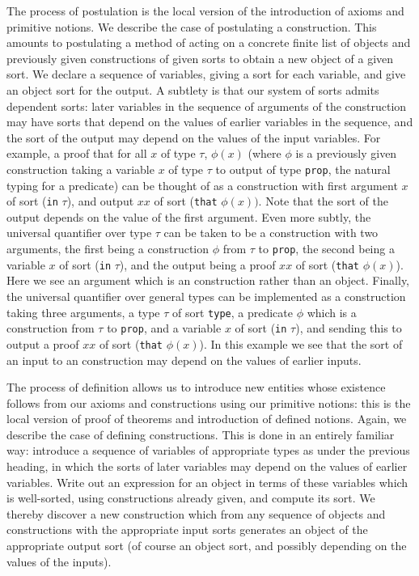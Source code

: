 \documentclass[12pt]{article}
\begin{document}
The process of postulation is the local version of the introduction of axioms and primitive notions.  We describe the case of postulating a construction.  This amounts to postulating a method of acting on a concrete finite list of objects and previously given constructions of given
sorts to obtain a new object of a given sort.  We declare a sequence of variables, giving a sort for each variable, and give an object sort for the output.  A subtlety is that our system of sorts admits dependent sorts:  later variables in the sequence of arguments of the construction may have sorts that depend on the values of  earlier variables in the sequence,  and the sort of the output may depend on the values of the input variables.  For example,
a proof that for all $x$ of type $\tau$, $\phi(x)$ (where $\phi$ is a previously given construction taking a variable $x$ of type $\tau$ to output of type {\tt prop}, the natural typing for a predicate) can be thought of as a construction with first argument $x$ of sort ({\tt in} $\tau$), and output $xx$ of sort ({\tt that} $\phi(x))$.  Note that the sort of the output depends on the value of the first argument.  Even more subtly, the universal quantifier over type $\tau$ can be taken to be a construction with two arguments, the first being a construction $\phi$ from
$\tau$ to {\tt prop}, the second being a variable $x$ of sort ({\tt in}  $\tau$), and the output being a proof $xx$ of sort ({\tt that} $\phi(x)$).   Here we see an argument which is an construction rather than an object.   Finally, the universal quantifier over general types can be implemented as a construction taking three arguments, a type $\tau$ of sort {\tt type},
a predicate $\phi$  which is a construction from $\tau$ to {\tt prop}, and a variable $x$ of sort ({\tt in} $\tau$), and sending this to output a proof $xx$ of sort ({\tt that} $\phi(x)$).
In this example we see that the sort of an input to an construction may depend on the values of earlier inputs.

The process of definition allows us to introduce new entities whose existence follows from our axioms and constructions using our primitive notions:   this is the local version of proof of theorems and introduction of defined notions. Again, we describe the case of defining constructions.  This is done in an entirely familiar way:
introduce a sequence of variables of appropriate types as under the previous heading, in which the sorts of later variables may depend on the values of earlier variables.   Write out an expression  for an object in terms of these variables which is well-sorted, using constructions
already given, and compute its sort.  We thereby discover a new construction which from any sequence of objects and constructions with the appropriate input sorts generates an object of the appropriate output sort (of course an object sort, and possibly depending on the values of the inputs).
\end{document}
